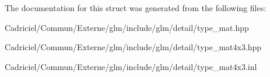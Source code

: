 The documentation for this struct was generated from the following files\+:\begin{DoxyCompactItemize}
\item 
Cadriciel/\+Commun/\+Externe/glm/include/glm/detail/type\+\_\+mat.\+hpp\item 
Cadriciel/\+Commun/\+Externe/glm/include/glm/detail/type\+\_\+mat4x3.\+hpp\item 
Cadriciel/\+Commun/\+Externe/glm/include/glm/detail/type\+\_\+mat4x3.\+inl\end{DoxyCompactItemize}
